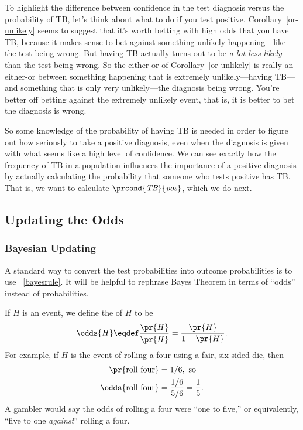 To highlight the difference between confidence in the test diagnosis
versus the probability of TB, let's think about what to do if you test
positive.  Corollary~\ref{or-unlikely} seems to suggest that it's
worth betting with high odds that you have TB, because it makes sense
to bet against something unlikely happening---like the test being
wrong.  But having TB actually turns out to be \emph{a lot less
  likely} than the test being wrong.  So the either-or of
Corollary~\ref{or-unlikely} is really an either-or between something
happening that is extremely unlikely---having TB---and something that
is only very unlikely---the diagnosis being wrong.  You're better off
betting against the extremely unlikely event, that is, it is better to
bet the diagnosis is wrong.

So some knowledge of the probability of having TB is needed in order
to figure out how seriously to take a positive diagnosis, even when
the diagnosis is given with what seems like a high level of
confidence.  We can see exactly how the frequency of TB in a
population influences the importance of a positive diagnosis by actually
calculating the probability that someone who tests positive has TB.
That is, we want to calculate $\prcond{\TB}{\testplus}$, which we do
next.

\subsection{Updating the Odds}

\subsubsection{Bayesian Updating}
A standard way to convert the test probabilities into outcome
probabilities is to use ~\eqref{bayesrule}.  It
will be helpful to rephrase Bayes Theorem in terms of ``odds'' instead
of probabilities.

If $H$ is an event, we define the  of $H$ to be
\[
\odds{H} \eqdef \frac{\pr{H}}{\pr{\bar{H}}} = \frac{\pr{H}}{1-\pr{H}}.
\]
For example, if $H$ is the event of rolling a four using a fair,
six-sided die, then
\begin{align*}
\pr{\text{roll four}} & = 1/6,\text{ so}\\
\odds{\text{roll four}} & = \frac{1/6}{5/6} = \frac{1}{5}.
\end{align*}
A gambler would say the odds of rolling a four were ``one to five,''
or equivalently, ``five to one \emph{against}'' rolling a four.

